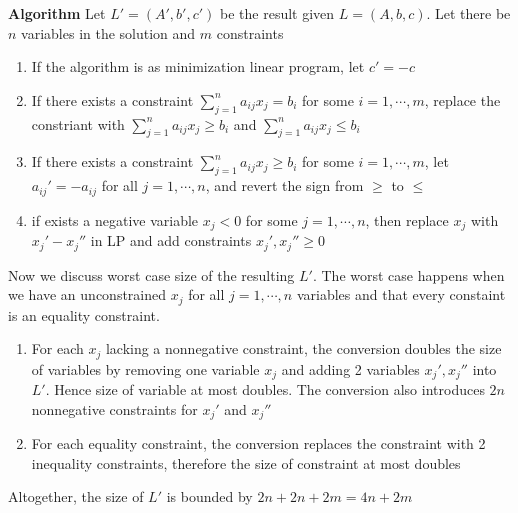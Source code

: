 \documentclass[11pt]{article}
\begin{document}
\begin{enumerate}
\begin{enumerate}
        \begin{solution}
            \textbf{Algorithm}
            Let $L' = (A', b', c')$ be the result given $L = (A, b, c)$. Let there be $n$ variables in the solution and $m$ constraints
            \begin{enumerate}
                \item If the algorithm is as minimization linear program, let $c' = -c$
                \item If there exists a constraint $\sum_{j=1}^n a_{ij} x_j = b_i$ for some $i = 1,\cdots, m$, replace the constriant with $\sum_{j=1}^n a_{ij} x_j \geq b_i$ and $\sum_{j=1}^n a_{ij} x_j \leq b_i$
                \item If there exists a constraint  $\sum_{j=1}^n a_{ij} x_j \geq b_i$ for some $i = 1,\cdots, m$,  let $a_{ij}' = -a_{ij}$ for all $j = 1,\cdots, n$, and revert the sign from $\geq$ to $\leq$
                \item if exists a negative variable $x_j < 0$ for some $j=  1,\cdots, n$, then replace $x_j$ with $x_j' - x_j''$ in LP and add constraints $x_j', x_j'' \geq 0$
            \end{enumerate}
            Now we discuss worst case size of the resulting $L'$. The worst case happens when we have an unconstrained $x_j$ for all $j = 1,\cdots, n$ variables and that every constaint is an equality constraint. 
            \begin{enumerate}
                \item For each $x_j$ lacking a nonnegative constraint, the conversion doubles the size of variables by removing one variable $x_j$ and adding 2 variables $x_j', x_j''$ into $L'$. Hence size of variable at most doubles. The conversion also introduces $2n$ nonnegative constraints for $x_j'$ and $x_j''$
                \item For each equality constraint, the conversion replaces the constraint with 2 inequality constraints, therefore the size of constraint at most doubles
            \end{enumerate}
            Altogether, the size of $L'$ is bounded by $2n + 2n + 2m = 4n + 2m$
        \end{solution}
    \end{enumerate}

\end{enumerate}
\end{document}

